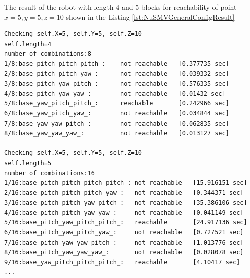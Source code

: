 The result of the robot with length 4 and 5 blocks for reachability of point \\
 $x=5, y=5, z=10 $ shown in the Listing \ref{lst:NuSMVGeneralConfigResult}

\begin{lstlisting}[language=NuSMV, caption={The output of configuration model checking 
    for lengths of robot 4 and 5 and target region x=-5..5, y=-5..5, z=0..5}, 
    label={lst:NuSMVGeneralConfigResult}]
Checking self.X=5, self.Y=5, self.Z=10
self.length=4                                                                                            
number of combinations:8                                                                                 
1/8:base_pitch_pitch_pitch_:    not reachable   [0.377735 sec]        
2/8:base_pitch_pitch_yaw_:      not reachable   [0.039332 sec]        
3/8:base_pitch_yaw_pitch_:      not reachable   [0.576335 sec]                                           
4/8:base_pitch_yaw_yaw_:        not reachable   [0.01432 sec]                                            
5/8:base_yaw_pitch_pitch_:      reachable       [0.242966 sec]
6/8:base_yaw_pitch_yaw_:        not reachable   [0.034844 sec]
7/8:base_yaw_yaw_pitch_:        not reachable   [0.062835 sec]
8/8:base_yaw_yaw_yaw_:          not reachable   [0.013127 sec]            

Checking self.X=5, self.Y=5, self.Z=10
self.length=5                                                                                            
number of combinations:16                                                                                
1/16:base_pitch_pitch_pitch_pitch_: not reachable   [15.916151 sec]                                                                                                                                              
2/16:base_pitch_pitch_pitch_yaw_:   not reachable   [0.344371 sec]                                                                                                                                               
3/16:base_pitch_pitch_yaw_pitch_:   not reachable   [35.386106 sec]                                  
4/16:base_pitch_pitch_yaw_yaw_:     not reachable   [0.041149 sec]                                           
5/16:base_pitch_yaw_pitch_pitch_:   reachable       [24.917136 sec]                                  
6/16:base_pitch_yaw_pitch_yaw_:     not reachable   [0.727521 sec]        
7/16:base_pitch_yaw_yaw_pitch_:     not reachable   [1.013776 sec]         
8/16:base_pitch_yaw_yaw_yaw_:       not reachable   [0.028078 sec]
9/16:base_yaw_pitch_pitch_pitch_:   reachable       [4.10417 sec]                                    
...
\end{lstlisting}

